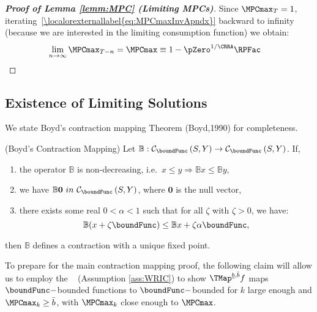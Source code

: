 \documentclass[\econtexRoot/BufferStockTheory]{subfiles}
\begin{document}
\begin{proof}[\textbf{Proof of Lemma \ref{lemm:MPC} (Limiting MPCs)}]
Since $\MPCmax_{T}=1$, iterating~\eqref{\localorexternallabel{eq:MPCmaxInvApndx}} backward to
infinity (because we are interested in the limiting consumption function) we obtain:
\begin{equation}\begin{gathered}\begin{aligned}
\lim_{n\rightarrow\infty}\MPCmax_{T-n} 
& = \MPCmax \equiv 1-\pZero^{1/\CRRA}\RPFac  \label{eq:MPCmaxDef}
\end{aligned}\end{gathered}\end{equation}




\end{proof}

\hypertarget{It-Is-A-Contraction-Mapping}{}
\subsection{Existence of Limiting Solutions}\label{sec:Tcontractionmapping}

We state Boyd's contraction mapping Theorem (Boyd,1990) for completeness. 

\begin{theorem}(Boyd's Contraction Mapping)
Let $\mathbb{B}:\mathcal{C}_{\boundFunc }\left( S,Y\right)
  \rightarrow \mathcal{C}_{\boundFunc }\left(S,Y\right) $. If, 
\begin{enumerate}
  \item the operator $\mathbb{B}$ is non-decreasing, i.e.\ ${x} \leq {y}\Rightarrow\mathbb{B}{x} \leq \mathbb{B}{y}$,
  \item we have $\mathbb{B}\mathbf{0}\ in ~ \mathcal{C}_{\boundFunc }\left(S,Y\right) $, where $\mathbf{0}$ is the null vector,
  \item there exists some real $0 < \alpha < 1$ such that for all $\zeta$ with $\zeta > 0$, we have:
             $$\mathbb{B}({x} +\zeta\boundFunc ) \leq \mathbb{B}{x} +\zeta\alpha \boundFunc,$$
\end{enumerate}
then $\mathbb{B}$ defines a contraction with a unique fixed point.
\end{theorem}

To prepare for the main contraction mapping proof, the following claim will allow us to employ the \WRIC~ (Assumption \ref{ass:WRIC}) to show  $\TMap^{\underline{b}, \bar{b}}f$ maps $\boundFunc-$bounded functions to $\boundFunc-$bounded for $k$ large enough and $\MPCmax_{k} \geq \bar{b}$,  with $\MPCmax_{k}$ close enough to $\MPCmax$. 
\end{document}
